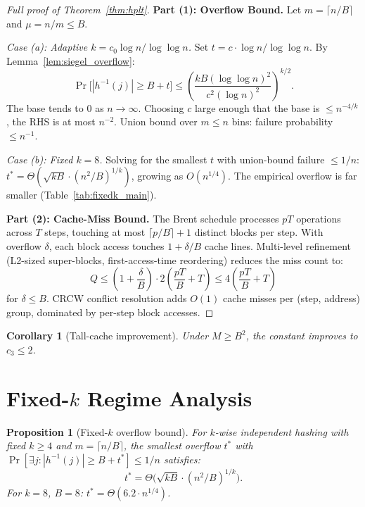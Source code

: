 \documentclass[11pt]{article}
\newtheorem{corollary}[theorem]{Corollary}
\newtheorem{proposition}[theorem]{Proposition}
\begin{document}
\begin{proof}[Full proof of Theorem~\ref{thm:hplt}]
\textbf{Part (1): Overflow Bound.}
Let $m = \lceil n/B \rceil$ and $\mu = n/m \le B$.

\emph{Case (a): Adaptive $k = c_0 \log n / \log\log n$.}
Set $t = c \cdot \log n / \log\log n$.  By Lemma~\ref{lem:siegel_overflow}:
\[
  \Pr\bigl[|h^{-1}(j)| \ge B + t\bigr]
  \le \left(\frac{k B (\log\log n)^2}{c^2 (\log n)^2}\right)^{k/2}.
\]
The base tends to 0 as $n \to \infty$.  Choosing $c$ large enough that
the base is $\le n^{-4/k}$, the RHS is at most $n^{-2}$.  Union bound
over $m \le n$ bins: failure probability $\le n^{-1}$.

\emph{Case (b): Fixed $k = 8$.}
Solving for the smallest $t$ with union-bound failure $\le 1/n$:
$t^* = \Theta(\sqrt{kB} \cdot (n^2/B)^{1/k})$, growing as $O(n^{1/4})$.
The empirical overflow is far smaller (Table~\ref{tab:fixedk_main}).

\medskip
\textbf{Part (2): Cache-Miss Bound.}
The Brent schedule processes $pT$ operations across $T$ steps, touching
at most $\lceil p/B \rceil + 1$ distinct blocks per step.  With overflow
$\delta$, each block access touches $1 + \delta/B$ cache lines.
Multi-level refinement (L2-sized super-blocks, first-access-time
reordering) reduces the miss count to:
\[
  Q \le \left(1 + \frac{\delta}{B}\right) \cdot 2\left(\frac{pT}{B} + T\right)
  \le 4\left(\frac{pT}{B} + T\right)
\]
for $\delta \le B$.  CRCW conflict resolution adds $O(1)$ cache misses
per (step, address) group, dominated by per-step block accesses.
\end{proof}

\begin{corollary}[Tall-cache improvement]
Under $M \ge B^2$, the constant improves to $c_3 \le 2$.
\end{corollary}

\section{Fixed-$k$ Regime Analysis}
\label{app:fixedk}

\begin{proposition}[Fixed-$k$ overflow bound]
\label{prop:fixedk}
For $k$-wise independent hashing with fixed $k \ge 4$ and
$m = \lceil n/B \rceil$, the smallest overflow $t^*$ with
$\Pr[\exists j: |h^{-1}(j)| \ge B + t^*] \le 1/n$ satisfies:
\[
  t^* = \Theta\bigl(\sqrt{kB} \cdot (n^2/B)^{1/k}\bigr).
\]
For $k = 8$, $B = 8$: $t^* = \Theta(6.2 \cdot n^{1/4})$.
\end{proposition}
\end{document}
